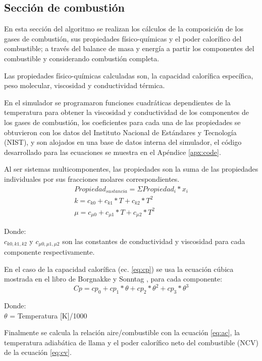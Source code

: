 \subsection{Sección de combustión}
\par En esta sección del algoritmo se realizan los cálculos de la composición de los gases de combustión, sus propiedades físico-químicas y el poder calorífico del combustible; a través del balance de masa y energía a partir los componentes del combustible y considerando combustión completa.
\par Las propiedades físico-químicas calculadas son, la capacidad calorífica específica, peso molecular, viscosidad y conductividad térmica.
\par En el simulador se programaron funciones cuadráticas dependientes de la temperatura para obtener la viscosidad y conductividad de los componentes de los gases de combustión, los coeficientes para cada una de las propiedades se obtuvieron con los datos del Instituto Nacional de Estándares y Tecnología (NIST)\cite{nist}, y son alojados en una base de datos interna del simulador, el código desarrollado para las ecuaciones se muestra en el Apéndice \ref{apx:code}.
\par Al ser sistemas multicomponentes, las propiedades son la suma de las propiedades individuales por sus fracciones molares correspondientes.
\begin{gather}
    Propiedad_{sustancia} = \Sigma Propiedad_{i} * x_i \\
    k = c_{k0} + c_{k1}*T + c_{k2}*T^2 \\
    \mu = c_{\mu0} + c_{\mu1}*T + c_{\mu2}*T^2
\end{gather}
\par Donde:\\
$c_{k0,k1,k2}$ y $c_{\mu0,\mu1,\mu2}$ son las constantes de conductividad y viscosidad para cada componente respectivamente.
\par En el caso de la capacidad calorífica (ec. \ref{eq:cp}) se usa la ecuación cúbica mostrada en el libro de Borgnakke y Sonntag \cite{bib:vanwylen}, para cada componente: 
\begin{equation}
\label{eq:cp}
    Cp = cp_0 + cp_1*\theta + cp_2*\theta^2 + cp_3*\theta^3
\end{equation}
\par Donde:\\
$\theta$ = Temperatura [K]/1000
\par Finalmente se calcula la relación aire/combustible con la ecuación \ref{eq:ac}, la temperatura adiabática de llama y el poder calorífico neto del combustible (NCV) de la ecuación \ref{eq:cv}.

